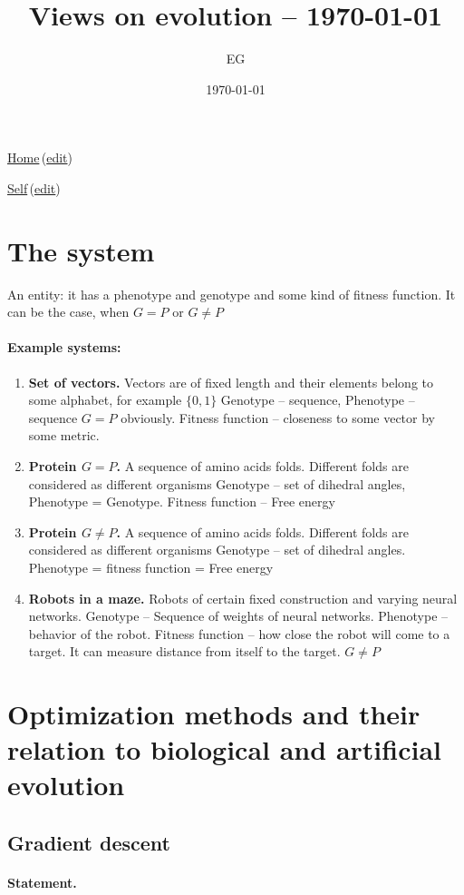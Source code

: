 \documentclass[12pt]{paper}
\title{Views on evolution -- \today}
\author{EG}
\date{\today}
\newcommand{\wikilink}[2] { \href{#1.pdf}{#2}\,(\href{#1.tex}{edit})}
\begin{document}
 \maketitle
 
 \wikilink{home}{Home}

\wikilink{viewsEvolution}{Self}
 
 \tableofcontents
 \section{The system}
 
 An entity: it has a phenotype and genotype and some kind of fitness function. It can be the case, 
when $G=P$ or $G\neq P$

 \paragraph{Example systems:}
\begin{enumerate}
 \item \textbf{Set of vectors.} Vectors are of fixed length and their elements belong to some 
alphabet, for example $\{0,1\}$
  \subitem Genotype -- sequence, Phenotype -- sequence $G=P$ obviously. Fitness function -- 
closeness to some vector by some metric.
  \item \textbf{Protein $G=P$.} A sequence of amino acids folds. Different folds are considered as 
different organisms
  \subitem Genotype -- set of dihedral angles, Phenotype = Genotype. Fitness function -- Free energy
  \item \textbf{Protein $G\neq P$.} A sequence of amino acids folds. Different folds are considered 
as different organisms
  \subitem Genotype -- set of dihedral angles. Phenotype = fitness function = Free energy
  \item \textbf{Robots in a maze.} Robots of certain fixed construction and varying neural networks.
  \subitem Genotype -- Sequence of weights of neural networks. Phenotype -- behavior of the robot. 
Fitness function -- how close the robot will come to a target. It can measure distance from 
itself to the target. $G\neq P$
\end{enumerate}

 
 
 \section{Optimization methods and their relation to biological and artificial evolution}
 
 \subsection{Gradient descent}
 
 \paragraph{Statement.} 
 
 
\end{document}
